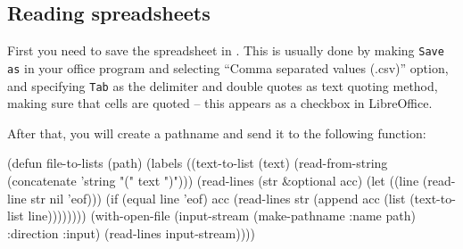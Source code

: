 \documentclass[a4paper,11pt]{article}
\begin{document}
\subsection{Reading spreadsheets}

\begin{uenum}

\item First you need to save the spreadsheet in . This is usually done by making \Verb+Save as+ in your office program and selecting ``Comma separated values (.csv)'' option, and specifying \Verb+Tab+ as the delimiter and double quotes as text quoting method, making sure that cells are quoted -- this appears as a checkbox in LibreOffice.

\item After that, you will create a pathname and send it to the following function:

{\small
\begin{lispcode}
(defun file-to-lists (path)
  (labels ((text-to-list (text)
						 (read-from-string 
						   (concatenate 'string "(" text ")")))
		   (read-lines (str &optional acc)
					   (let ((line (read-line str nil 'eof)))
						 (if (equal line 'eof)
						   acc
						   (read-lines 
							 str 
							 (append
							   acc
							   (list (text-to-list line))))))))
	(with-open-file (input-stream 
					  (make-pathname :name path)
					  :direction :input)
	  (read-lines input-stream))))
\end{lispcode}
}
\end{uenum}

\newpage


\end{document}
